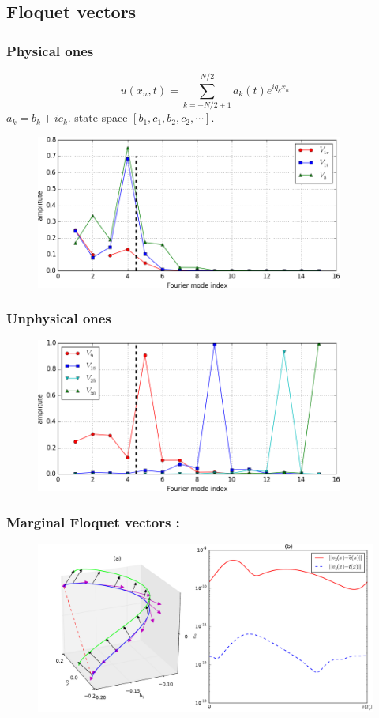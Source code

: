 \documentclass[mathserif, handout]{beamer}
\begin{document}
\subsection{Floquet vectors }

\begin{frame}
  \frametitle{Physical ones}
  \[ u(x_{n},t)= \sum_{k=-N/2+1}^{N/2} a_{k}(t)e^{iq_{k}x_{n}} \]
  $a_k = b_k + ic_k$. {\color{green} state space}
  $[b_1, c_1, b_2, c_2, \cdots ]$.
  \begin{figure}[h]
    \centering
    \includegraphics[width=0.9\textwidth]{fv_ppo1_low}
  \end{figure}
\end{frame}

\begin{frame}
  \frametitle{Unphysical ones}
  \begin{figure}[h]
    \centering
    \includegraphics[width=0.9\textwidth]{fv_ppo1_high}
  \end{figure}
\end{frame}

\begin{frame}
  \frametitle{Marginal Floquet vectors : }
  \begin{figure}[h]
    \centering
    \includegraphics[width=1.0\textwidth]{ppo1vectfield64}
  \end{figure}
\end{frame}
\end{document}

